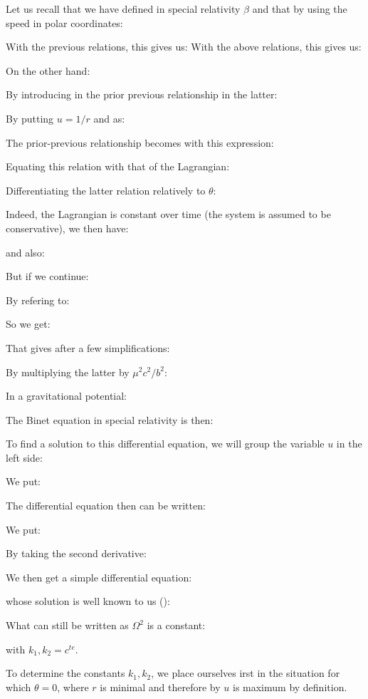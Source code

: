 	Let us recall that we have defined in special relativity $\beta$ and that by using the speed in polar coordinates:
	
	With the previous relations, this gives us:
	With the above relations, this gives us:
	
	On the other hand:
	
	By introducing in the prior previous relationship in the latter:
	
	By putting $u=1/r$ and as:
	
	The prior-previous relationship becomes with this expression:
	
	Equating this relation with that of the Lagrangian:
	
	Differentiating the latter relation relatively to $\theta$:
	
	Indeed, the Lagrangian is constant over time (the system is assumed to be conservative), we then have:
	
	and also:
	
	But if we continue:
	
	By refering to:
	
	So we get:
	
	That gives after a few simplifications:
		
	By multiplying the latter by $\mu^2c^2/b^2$:
	
	In a gravitational potential:
	
	The Binet equation in special relativity is then:
	
	To find a solution to this differential equation, we will group the variable $u$ in the left side:
	
	We put:
	
	The differential equation then can be written:
	
	We put:
	
	By taking the second derivative:
	
	We then get a simple differential equation:
	
	whose solution is well known to us ():
	
	What can still be written as $\Omega^2$ is a constant:
	
	with $k_1,k_2=c^{te}$.

	To determine the constants $k_1,k_2$, we place ourselves irst in the situation for which $\theta=0$, where $r$ is minimal and therefore by $u$ is maximum by definition.
	
